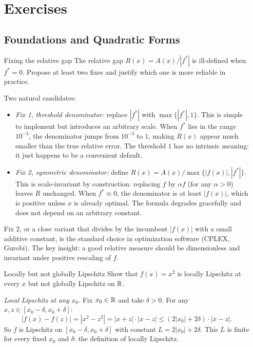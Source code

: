 \appendix
\section{Exercises}\label{app:exercises}

\subsection{Foundations and Quadratic Forms}\label{app:ex-foundations}

\begin{exercise}{Fixing the relative gap}\label{ex:relative-gap}
	The relative gap $R(x) = A(x)/|f^*|$ is ill-defined when $f^* = 0$.
	Propose at least two fixes and justify which one is more reliable in practice.
\end{exercise}

\solution
Two natural candidates:
\begin{itemize}
	\item \textit{Fix 1, threshold denominator:} replace $|f^*|$ with $\max\{|f^*|, 1\}$.
		This is simple to implement but introduces an arbitrary scale.
		When $f^*$ lies in the range $10^{-3}$, the denominator jumps from $10^{-3}$ to $1$, making $R(x)$ appear much smaller than the true relative error.
		The threshold $1$ has no intrinsic meaning: it just happens to be a convenient default.
	\item \textit{Fix 2, symmetric denominator:} define $R(x) = A(x) / \max\{|f(x)|, |f^*|\}$.
		This is scale-invariant by construction: replacing $f$ by $\alpha f$ (for any $\alpha > 0$) leaves $R$ unchanged.
		When $f^* \approx 0$, the denominator is at least $|f(x)|$, which is positive unless $x$ is already optimal.
		The formula degrades gracefully and does not depend on an arbitrary constant.
\end{itemize}
Fix 2, or a close variant that divides by the incumbent $|f(x)|$ with a small additive constant, is the standard choice in optimization software (CPLEX, Gurobi).
The key insight: a good relative measure should be dimensionless and invariant under positive rescaling of $f$.

\begin{exercise}{Locally but not globally Lipschitz}\label{ex:lipschitz-not-global}
	Show that $f(x) = x^2$ is locally Lipschitz at every $x$ but not globally Lipschitz on $\mathbb{R}$.
\end{exercise}

\solution
\textit{Local Lipschitz at any $x_0$.}
Fix $x_0 \in \mathbb{R}$ and take $\delta > 0$.
For any $x, z \in [x_0 - \delta, x_0 + \delta]$:
\begin{equation}\label{eq:ex-local-lip}
	|f(x) - f(z)| = |x^2 - z^2| = |x + z| \cdot |x - z| \leq (2|x_0| + 2\delta) \cdot |x - z|.
\end{equation}
So $f$ is Lipschitz on $[x_0 - \delta, x_0 + \delta]$ with constant $L = 2|x_0| + 2\delta$.
This $L$ is finite for every fixed $x_0$ and $\delta$: the definition of locally Lipschitz.


